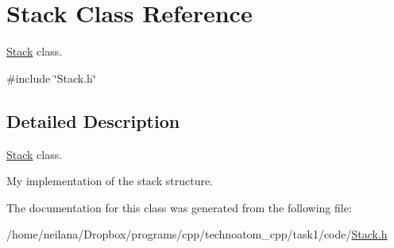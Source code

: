 \hypertarget{class_stack}{}\section{Stack Class Reference}
\label{class_stack}


\hyperlink{class_stack}{Stack} class.  




{\ttfamily \#include \char`\"{}Stack.\+h\char`\"{}}



\subsection{Detailed Description}
\hyperlink{class_stack}{Stack} class. 

My implementation of the stack structure. 

The documentation for this class was generated from the following file\+:\begin{DoxyCompactItemize}
\item 
/home/neilana/\+Dropbox/programs/cpp/technoatom\+\_\+cpp/task1/code/\hyperlink{_stack_8h}{Stack.\+h}\end{DoxyCompactItemize}
